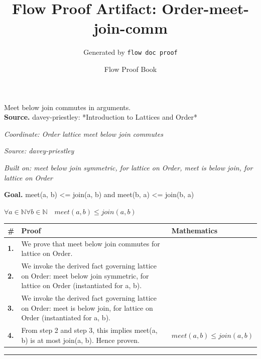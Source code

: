 \documentclass[11pt]{article}
\title{Flow Proof Artifact: Order-meet-join-comm}
\author{Generated by \texttt{flow doc proof}}
\date{Flow Proof Book}
\theoremstyle{definition}
\begin{document}
\maketitle
Meet below join commutes in arguments.\\[0.5em]
\textbf{Source.} davey-priestley: *Introduction to Lattices and Order*\\[0.5em]
\bigskip
{}\par
\smallskip\noindent\textit{Coordinate: Order \cdot lattice \cdot meet below join commutes}\par
\smallskip\noindent\textit{Source: davey-priestley}\par
\smallskip\noindent\textit{Built on: meet below join symmetric, for lattice on Order, meet is below join, for lattice on Order}\par
\medskip
\noindent\textbf{Goal.} meet(a, b) <= join(a, b) and meet(b, a) <= join(b, a)\par
\noindent$\displaystyle \forall a \in \mathbb{N} \forall b \in \mathbb{N}\quad meet(a, b) \le join(a, b)$\par
\medskip
\noindent
\begin{tabular}{@{} >{\raggedright\arraybackslash}p{} >{\raggedright\arraybackslash}p{} >{\raggedleft\arraybackslash}p{} @{}}
\textbf{\#} & \textbf{Proof} & \textbf{Mathematics} \\
\midrule
\textbf{1.} & We prove that meet below join commutes for lattice on Order. & \\[0.45em]
\textbf{2.} & We invoke the derived fact governing lattice on Order: meet below join symmetric, for lattice on Order (instantiated for a, b). & \\[0.45em]
\textbf{3.} & We invoke the derived fact governing lattice on Order: meet is below join, for lattice on Order (instantiated for a, b). & \\[0.45em]
\textbf{4.} & From step 2 and step 3, this implies meet(a, b) is at most join(a, b). Hence proven. & $\displaystyle meet(a, b) \le join(a, b)$ \\[0.45em]
\bottomrule
\end{tabular}
\label{thm:Order-lattice-meet_below_join_commutes}
\par\medskip\hrule
\end{document}
